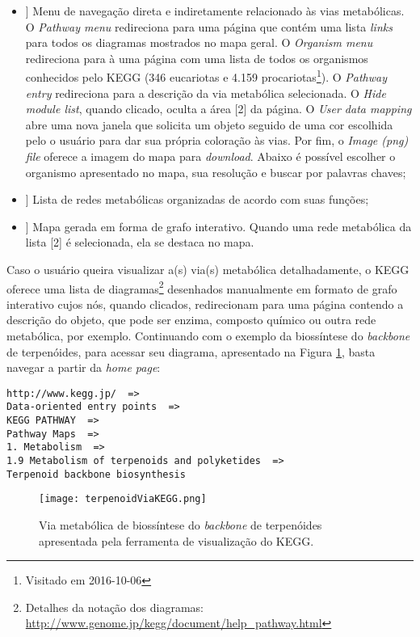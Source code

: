 \begin{itemize}
\item[[ 1]] Menu de navegação direta e indiretamente relacionado às vias metabólicas. O \textit{Pathway menu} redireciona para uma página que contém uma lista \textit{links} para todos os diagramas mostrados no mapa geral. O \textit{Organism menu} redireciona para à uma página com uma lista de todos os organismos conhecidos pelo KEGG (346 eucariotas e 4.159 procariotas\footnote{Visitado em 2016-10-06}). O \textit{Pathway entry} redireciona para a descrição da via metabólica selecionada. O \textit{Hide module list}, quando clicado, oculta a área [2] da página. O \textit{User data mapping} abre uma nova janela que solicita um objeto seguido de uma cor escolhida pelo o usuário para dar sua própria coloração às vias. Por fim, o \textit{Image (png) file} oferece a imagem do mapa para \textit{download}. Abaixo é possível escolher o organismo apresentado no mapa, sua resolução e buscar por palavras chaves;
\item[[ 2]] Lista de redes metabólicas organizadas de acordo com suas funções;
\item[[ 3]] Mapa gerada em forma de grafo interativo. Quando uma rede metabólica da lista [2] é selecionada, ela se destaca no mapa.
\end{itemize}

\indent Caso o usuário queira visualizar a(s) via(s) metabólica detalhadamente, o KEGG oferece uma lista de diagramas\footnote{Detalhes da notação dos diagramas: \url{http://www.genome.jp/kegg/document/help_pathway.html}} desenhados manualmente em formato de grafo interativo cujos nós, quando clicados, redirecionam para uma página contendo a descrição do objeto, que pode ser enzima, composto químico ou outra rede metabólica, por exemplo. Continuando com o exemplo da biossíntese do \textit{backbone} de terpenóides, para acessar seu diagrama, apresentado na Figura \ref{terpenoidBackboneKEGG}, basta navegar a partir da \textit{home page}: \\

\begin{lstlisting}[frame=single] 
http://www.kegg.jp/  =>
Data-oriented entry points  =>
KEGG PATHWAY  =>
Pathway Maps  =>
1. Metabolism  =>
1.9 Metabolism of terpenoids and polyketides  =>
Terpenoid backbone biosynthesis
\end{lstlisting}

\newpage

\begin{figure}[!h]
\centering
\texttt{[image: terpenoidViaKEGG.png]}
\caption{Via metabólica de biossíntese do \textit{backbone} de terpenóides apresentada pela ferramenta de visualização do KEGG.}
\label{terpenoidBackboneKEGG}
\end{figure}

